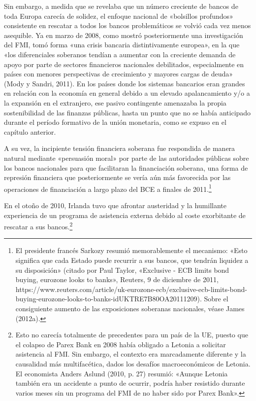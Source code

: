 \documentclass[10pt,a4paper]{article}
\begin{document}
{Sin embargo, a medida que se revelaba que un número creciente de bancos de toda Europa carecía de solidez, el enfoque nacional de «bolsillos profundos» consistente en rescatar a todos los bancos problemáticos se volvió cada vez menos asequible. Ya en marzo de 2008, como mostró posteriormente una investigación del FMI, tomó forma «una crisis bancaria distintivamente europea», en la que «los diferenciales soberanos tendían a aumentar con la creciente demanda de apoyo por parte de sectores financieros nacionales debilitados, especialmente en países con menores perspectivas de crecimiento y mayores cargas de deuda» (Mody y Sandri, 2011). En los países donde los sistemas bancarios eran grandes en relación con la economía en general debido a un elevado apalancamiento y/o a la expansión en el extranjero, ese pasivo contingente amenazaba la propia sostenibilidad de las finanzas públicas, hasta un punto que no se había anticipado durante el período formativo de la unión monetaria, como se expuso en el capítulo anterior.

A su vez, la incipiente tensión financiera soberana fue respondida de manera natural mediante «persuasión moral» por parte de las autoridades públicas sobre los bancos nacionales para que facilitaran la financiación soberana, una forma de represión financiera que posteriormente se vería aún más favorecida por las operaciones de financiación a largo plazo del BCE a finales de 2011.\footnote{%
    El presidente francés Sarkozy resumió memorablemente el mecanismo: «Esto significa que cada Estado puede recurrir a sus bancos, que tendrán liquidez a su disposición» (citado por Paul Taylor, «Exclusive - ECB limits bond buying, eurozone looks to banks», Reuters, 9 de diciembre de 2011, https://www.reuters.com/article/uk-eurozone-ecb/exclusive-ecb-limits-bond-buying-eurozone-looks-to-banks-idUKTRE7B80OA20111209). Sobre el consiguiente aumento de las exposiciones soberanas nacionales, véase James (2012a).
}

En el otoño de 2010, Irlanda tuvo que afrontar austeridad y la humillante experiencia de un programa de asistencia externa debido al coste exorbitante de rescatar a sus bancos.\footnote{%
    Esto no carecía totalmente de precedentes para un país de la UE, puesto que el colapso de Parex Bank en 2008 había obligado a Letonia a solicitar asistencia al FMI. Sin embargo, el contexto era marcadamente diferente y la causalidad más multifacética, dados los desafíos macroeconómicos de Letonia. El economista Anders Aslund (2010, p. 27) resumió: «Aunque Letonia también era un accidente a punto de ocurrir, podría haber resistido durante varios meses sin un programa del FMI de no haber sido por Parex Bank».
}

}
\end{document}

